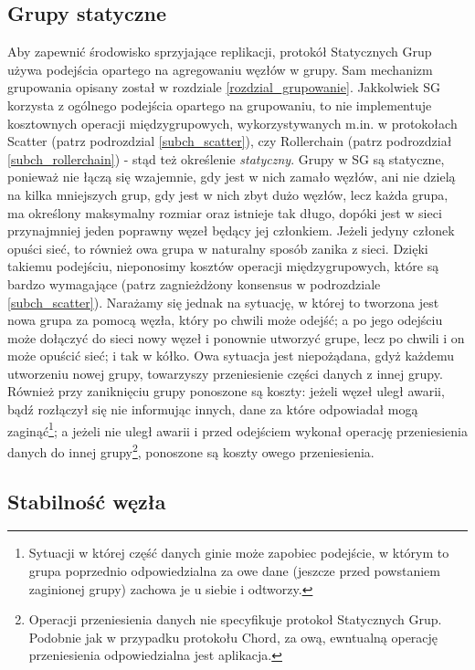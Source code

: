 \documentclass[12pt, twoside, openany]{report}
\begin{document}
\subsection{Grupy statyczne}
Aby zapewnić środowisko sprzyjające replikacji, protokół Statycznych Grup używa podejścia opartego na agregowaniu węzłów w grupy. Sam mechanizm grupowania opisany został w rozdziale \ref{rozdzial_grupowanie}. Jakkolwiek SG korzysta z ogólnego podejścia opartego na grupowaniu, to nie implementuje kosztownych operacji międzygrupowych, wykorzystywanych m.in. w protokołach Scatter (patrz podrozdzial \ref{subch_scatter}), czy Rollerchain (patrz podrozdział \ref{subch_rollerchain}) - stąd też określenie \textit{statyczny}. Grupy w SG są statyczne, ponieważ nie łączą się wzajemnie, gdy jest w nich zamało węzłów, ani nie dzielą na kilka mniejszych grup, gdy jest w nich zbyt dużo węzłów, lecz każda grupa, ma określony maksymalny rozmiar oraz istnieje tak długo, dopóki jest w sieci przynajmniej jeden poprawny węzeł będący jej członkiem. Jeżeli jedyny członek opuści sieć, to również owa grupa w naturalny sposób zanika z sieci. Dzięki takiemu podejściu, nieponosimy kosztów operacji międzygrupowych, które są bardzo wymagające (patrz zagnieżdżony konsensus w podrozdziale \ref{subch_scatter}). Narażamy się jednak na sytuację, w której to tworzona jest nowa grupa za pomocą węzła, który po chwili może odejść; a po jego odejściu może dołączyć do sieci nowy węzeł i ponownie utworzyć grupe, lecz po chwili i on może opuścić sieć; i tak w kółko. Owa sytuacja jest niepożądana, gdyż każdemu utworzeniu nowej grupy, towarzyszy przeniesienie części danych z innej grupy. Również przy zaniknięciu grupy ponoszone są koszty: jeżeli węzeł uległ awarii, bądź rozłączył się nie informując innych, dane za które odpowiadał mogą zaginąć\footnote{Sytuacji w której część danych ginie może zapobiec podejście, w którym to grupa poprzednio odpowiedzialna za owe dane (jeszcze przed powstaniem zaginionej grupy) zachowa je u siebie i odtworzy.}; a jeżeli nie uległ awarii i przed odejściem wykonał operację przeniesienia danych do innej grupy\footnote{Operacji przeniesienia danych nie specyfikuje protokoł Statycznych Grup. Podobnie jak w przypadku protokołu Chord, za ową, ewntualną operację przeniesienia odpowiedzialna jest aplikacja.}, ponoszone są koszty owego przeniesienia. 

\subsection{Stabilność węzła}
\label{stabilnosc_wezla}
\end{document}
